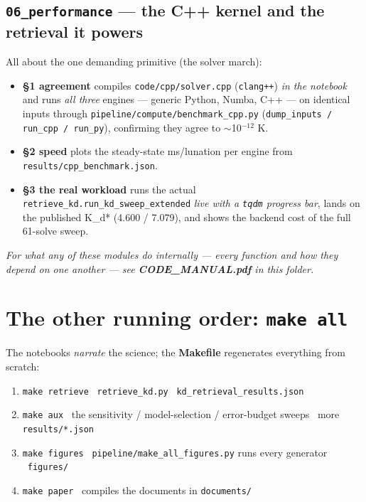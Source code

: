 \documentclass[11pt]{article}
\newcommand{\code}[1]{\texttt{\small #1}}
\newcommand{\fn}[1]{\texttt{\small\color{coral}#1}}
\newcommand{\arr}{\textrightarrow}
\newcommand{\nb}[1]{\texttt{\small\color{forest}#1}}
\begin{document}
\subsection{\nb{06\_performance} --- the C++ kernel and the retrieval it powers}
All about the one demanding primitive (the solver march):
\begin{itemize}
\item \textbf{\S1 agreement} compiles \code{code/cpp/solver.cpp} (\code{clang++}) \emph{in the notebook} and runs \emph{all three} engines --- generic Python, Numba, C++ --- on identical inputs through \fn{pipeline/compute/benchmark\_cpp.py} (\code{dump\_inputs / run\_cpp / run\_py}), confirming they agree to $\sim$10$^{-12}$ K.
\item \textbf{\S2 speed} plots the steady-state ms/lunation per engine from \code{results/cpp\_benchmark.json}.
\item \textbf{\S3 the real workload} runs the actual \fn{retrieve\_kd.run\_kd\_sweep\_extended} \emph{live with a \code{tqdm} progress bar}, lands on the published K\_d* (4.600 / 7.079), and shows the backend cost of the full 61-solve sweep.
\end{itemize}

\begin{center}\small\itshape\color{dimc}
For what any of these modules do internally --- every function and how they
depend on one another --- see \textbf{CODE\_MANUAL.pdf} in this folder.
\end{center}

\section{The other running order: \texttt{make all}}

The notebooks \emph{narrate} the science; the \textbf{Makefile} regenerates
everything from scratch:

\begin{enumerate}[leftmargin=1.6em]
\item \code{make retrieve} \arr\ \fn{retrieve\_kd.py} \arr\ \code{kd\_retrieval\_results.json}
\item \code{make aux} \arr\ the sensitivity / model-selection / error-budget sweeps \arr\ more \code{results/*.json}
\item \code{make figures} \arr\ \fn{pipeline/make\_all\_figures.py} runs every generator \arr\ \code{figures/}
\item \code{make paper} \arr\ compiles the documents in \code{documents/}
\end{enumerate}
\end{document}
